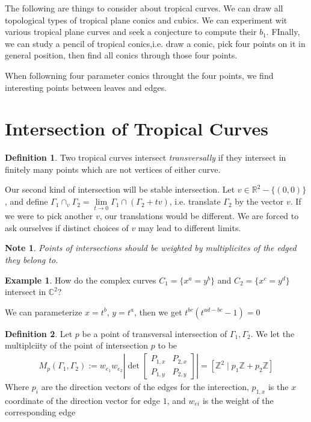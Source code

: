 \documentclass[11pt]{article}
\newtheorem{note}{Note}
\theoremstyle{definition}
\newtheorem{protoexample}{Example}[section]
\newenvironment{ex}
   {\begin{protoexample}}
   {\end{protoexample}}
\newtheorem{protodefinition}{Definition}[section]
\newenvironment{define}
   {\begin{protodefinition}}
   {\end{protodefinition}}
\def\ZZ{{\mathbb Z}}
\def\RR{{\mathbb R}}
\def\CC{{\mathbb C}}
\begin{document}
The following are things to consider about tropical curves. We can draw all topological types of tropical plane conics and cubics. We can experiment wit various tropical plane curves and seek a conjecture to compute their $b_1$. FInally, we can study a pencil of tropical conics,i.e. draw a conic, pick four points on it in general position, then find all conics through those four points.

When followning four parameter conics throught the four points, we find interesting points between leaves and edges.





\section{Intersection of Tropical Curves}

\begin{define}
Two tropical curves intersect \emph{transversally} if they intersect in finitely many points which are not vertices of either curve.
\end{define}


Our second kind of intersection will be stable intersection.
Let $v \in \RR^2 -\{(0,0)\}$, and define $\Gamma_1 \cap_v \Gamma_2= \lim\limits_{t \rightarrow 0} \Gamma_1 \cap (\Gamma_2 +tv)$, i.e. translate $\Gamma_2$ by the vector $v $. If we were to pick another $v$, our translations would be different. We are forced to ask ourselves if distinct choices of $v$ may lead to different limits.


\begin{note}
    Points of intersections should be weighted by multiplicites of the edged they belong to.
\end{note}



\begin{ex}
    How do the complex curves $C_1=\{x^a=y^b\}$ and $C_2=\{x^c=y^d\}$ intersect in $\CC^2$?

        We can parameterize $x=t^b$, $y=t^a$, then we get $t^{bc}(t^{ad-bc}-1)=0$
\end{ex}


\begin{define}
    Let $p$ be a point of transversal intersection of $\Gamma_1, \Gamma_2$. We let the multiplciity of the point of intersection $p$ to be 
    \begin{align*}
        M_p(\Gamma_1, \Gamma_2):=w_{e_1}w_{e_2} \left| \det \begin{bmatrix}
            P_{1,x} &P_{2,x} \\
            P_{1,y} &P_{2,y}
        \end{bmatrix}  \right| =[\ZZ^2\;|\; p_1 \ZZ + p_2 \ZZ]
    \end{align*}
    Where $p_i$ are the direction vectors of the edges for the interection, $p_{1,x}$ is the $x$ coordinate of the direction vector for edge $1$, and $w_{ei}$ is the weight of the corresponding edge
\end{define}
\end{document}
